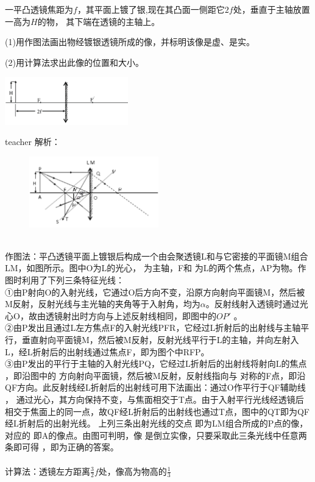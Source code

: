 \begin{example}
	一平凸透镜焦距为$f$，其平面上镀了银,现在其凸面一侧距它$ 2f$处，垂直于主轴放置一高为$H$的物， 其下端在透镜的主轴上。
	
	(1)用作图法画出物经镀银透镜所成的像，并标明该像是虚、是实。 
	
	(2)用计算法求出此像的位置和大小。
	
	\begin{flushright}
		\includegraphics[width = 0.4\textwidth]{images/opt-11.pdf} 
	\end{flushright}
	
	\begin{taggedblock}{teacher}
		\noindent
		解析：\begin{figure}
							\includegraphics[width = 0.5\textwidth]{images/opt-10-5.pdf} 
						\end{figure}
				\\作图法：平凸透镜平面上镀银后构成一个由会聚透镜L和与它密接的平面镜M组合LM，如图所示。图中O为L的光心， 为主轴，F和 为L的两个焦点，AP为物。作图时利用了下列三条特征光线：
				\\①由P射向O的入射光线，它通过O后方向不变，沿原方向射向平面镜M，然后被M反射，反射光线与主光轴的夹角等于入射角，均为$\alpha$。反射线射入透镜时通过光心O，故由透镜射出时方向与上述反射线相同，即图中的$OP'$ 。
				\\②由P发出且通过L左方焦点F的入射光线PFR，它经过L折射后的出射线与主轴平行，垂直射向平面镜M，然后被M反射，反射光线平行于L的主轴，并向左射入L，经L折射后的出射线通过焦点F，即为图个中RFP。
				\\③由P发出的平行于主轴的入射光线PQ，它经过L折射后的出射线将射向L的焦点 ，即沿图中的 方向射向平面镜，然后被M反射，反射线指向与 对称的F点，即沿QF方向。此反射线经L折射后的出射线可用下法画出：通过O作平行于QF辅助线 ， 通过光心，其方向保持不变，与焦面相交于T点。由于入射平行光线经透镜后相交于焦面上的同一点，故QF经L折射后的出射线也通过T点，图中的QT即为QF经L折射后的出射光线。
				上列三条出射光线的交点 即为LM组合所成的P点的像，对应的 即A的像点。由图可判明，像 是倒立实像，只要采取此三条光线中任意两条即可得 ，即为正确的答案。
				\\
				\\计算法：透镜左方距离$\frac{3}{2}f$处，像高为物高的$\frac{1}{3}$                                                                                                                                                                          
	\end{taggedblock}
\end{example}



